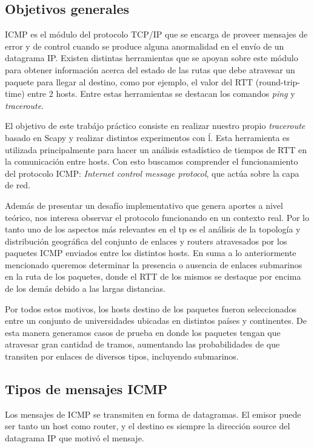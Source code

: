 \subsection{Objetivos generales}

ICMP es el m\'odulo del protocolo TCP/IP que se encarga de proveer mensajes de error y de control cuando
se produce alguna anormalidad en el env\'io de un datagrama IP. Existen distintas herramientas
que se apoyan sobre este m\'odulo para obtener informaci\'on acerca del estado de las rutas que
debe atravesar un paquete para llegar al destino, como por ejemplo, el valor del RTT (round-trip-time)
entre 2 hosts. Entre estas herramientas se destacan los comandos \emph{ping} y \emph{traceroute}.

El objetivo de este trab\'ajo pr\'actico consiste en realizar nuestro propio
\emph{traceroute} basado en Scapy y realizar distintos experimentos con \'l.
Esta herramienta es utilizada principalmente para hacer un an\'alisis estad\'istico de tiempos
de RTT en la comunicaci\'on entre hosts. Con esto buscamos comprender el funcionamiento del protocolo
ICMP: \emph{Internet control message protocol}, que act\'ua sobre la capa de red.

Adem\'as de presentar un desaf\'io implementativo que genera aportes a nivel te\'orico, nos interesa
observar el protocolo funcionando en un contexto real. Por lo tanto uno de los aspectos
m\'as relevantes en el tp es el an\'alisis de la topolog\'ia y distribuci\'on geogr\'afica del conjunto de enlaces
y routers atravesados por los paquetes ICMP enviados entre los distintos hosts. En suma a lo
anteriormente mencionado queremos determinar la presencia o ausencia de enlaces submarinos en
la ruta de los paquetes, donde el RTT de los mismos se destaque por encima de los
dem\'as debido a las largas distancias.

Por todos estos motivos, los hosts destino de los paquetes fueron seleccionados entre un conjunto de universidades ubicadas en distintos pa\'ises y continentes. De esta manera generamos casos de
prueba en donde los paquetes tengan que atravesar gran cantidad de tramos,
aumentando las probabilidades de que transiten por enlaces de diversos tipos, incluyendo submarinos.


\subsection{Tipos de mensajes ICMP}

Los mensajes de ICMP se transmiten en forma de datagramas. El emisor puede ser tanto un host como router,
y el destino es siempre la direcci\'on source del datagrama IP que motiv\'o el mensaje.


